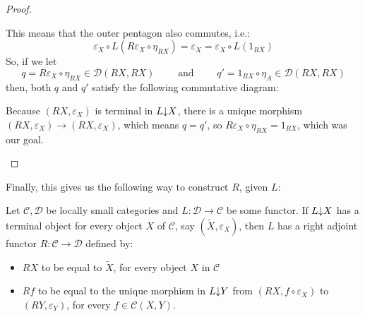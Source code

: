 \begin{proof}
\begin{itemize}
This means that the outer pentagon also commutes, i.e.:
\[\varepsilon_X\circ L(R\varepsilon_X\circ\eta_{RX})=\varepsilon_X=\varepsilon_X\circ L(1_{RX})\]
So, if we let
\[q=R\varepsilon_X\circ\eta_{RX}\in\mathcal{D}(RX,RX)\qquad\text{ and }\qquad q'=1_{RX}\circ\eta_A\in\mathcal{D}(RX,RX)\]
then, both $q$ and $q'$ satisfy the following commutative diagram:
\begin{center}
\end{center}
Because $(RX,\varepsilon_X)$ is terminal in $L\mkern-5mu\downarrow\mkern-5mu X$, there is a unique morphism $(RX,\varepsilon_X)\to(RX,\varepsilon_X)$, which means $q=q'$, so $R\varepsilon_X\circ\eta_{RX}=1_{RX}$, which was our goal.
\end{itemize}
\end{proof}
Finally, this gives us the following way to construct $R$, given $L$:
\begin{corollary}[co-2.3.7]\label{cor:adj_construction} Let $\mathcal{C},\mathcal{D}$ be locally small categories and $L:\mathcal{D}\to\mathcal{C}$ be some functor. If $L\mkern-5mu\downarrow\mkern-5mu X$ has a terminal object for every object $X$ of $\mathcal{C}$, say $(\tilde{X},\varepsilon_X)$, then $L$ has a right adjoint functor $R:\mathcal{C}\to\mathcal{D}$ defined by:
\begin{itemize}
\item $RX$ to be equal to $\tilde{X}$, for every object $X$ in $\mathcal{C}$
\item $Rf$ to be equal to the unique morphism in $L\mkern-5mu\downarrow\mkern-5mu Y$ from $(RX,f\circ\varepsilon_X)$ to $(RY,\varepsilon_Y)$, for every $f\in\mathcal{C}(X,Y)$.
\end{itemize}
\end{corollary}
